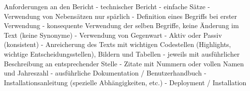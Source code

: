 \documentclass[
	11pt,
	a4paper,
	bibtotocnumbered
	]{scrreprt}
\begin{document}
\begin{singlespace}

\setcounter{page}{1}
\end{singlespace}

\tableofcontents

\cleardoublepage





Anforderungen an den Bericht
- technischer Bericht
- einfache Sätze
- Verwendung von Nebensätzen nur spärlich
- Definition eines Begriffs bei erster Verwendung
- konsequente Verwendung der selben Begriffe, keine Änderung im Text (keine Synonyme)
- Verwendung von Gegenwart
- Aktiv oder Passiv (konsistent)
- Anreicherung des Texts mit wichtigen Codestellen (Highlights, wichtige Entscheidungsstellen), Bildern und Tabellen
- jeweils mit ausführlicher Beschreibung an entsprechender Stelle
- Zitate mit Nummern oder vollen Namen und Jahreszahl
- ausführliche Dokumentation / Benutzerhandbuch 
- Installationsanleitung (spezielle Abhängigkeiten, etc.)
- Deployment / Installation









\begin{singlespace}
\printbibliography
\end{singlespace}

\end{document}
